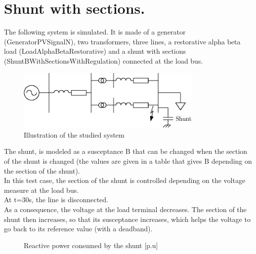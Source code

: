 \documentclass[a4paper, 12pt]{report}
\begin{document}
\chapter{Shunt with sections.}

The following system is simulated. It is made of a generator (GeneratorPVSignalN), two transformers, three lines, a restorative alpha beta load (LoadAlphaBetaRestorative) and a shunt with sections (ShuntBWithSectionsWithRegulation) connected at the load bus.\\

\begin{figure}[H]
  \begin{center}
  \includegraphics[width=0.8\textwidth]{ShuntWithRegulation}
  \end{center}
  \caption{Illustration of the studied system}
\end{figure}

The shunt, is modeled as a susceptance B that can be changed when the section of the shunt is changed (the values are given in a table that gives B depending on the section of the shunt).\\

In this test case, the section of the shunt is controlled depending on the voltage measure at the load bus.\\

At t=30s, the line is disconnected.\\

As a consequence, the voltage at the load terminal decreases. The section of the shunt then increases, so that its susceptance increases, which helps the voltage to go back to its reference value (with a deadband).

\begin{figure}[H]
  \caption{Reactive power consumed by the shunt [p.u]}
\end{figure}
\end{document}
